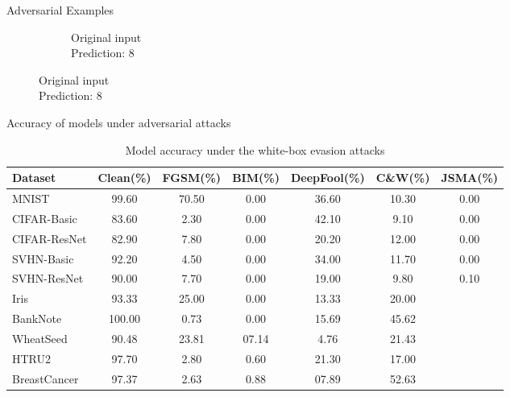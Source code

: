 \documentclass[9pt]{beamer}
\begin{document}
\begin{frame}{Adversarial Examples}
\begin{figure}
\begin{subfigure}[t]{0.24\linewidth}
        \caption{Original input\\Prediction: 8}
    \end{subfigure}
\end{figure}

\hyperlink{preprocessing}{}
\hyperlink{adv_training}{}
\hyperlink{stats}{}
\end{frame}

\begin{frame}{Accuracy of models under adversarial attacks}
\begin{table}
    \centering
    \footnotesize
    \begin{tabular}{|l|c|c|c|c|c|c|}
        \hline
        {Dataset} & {Clean(\%)} & {FGSM(\%)} & {BIM(\%)} & {DeepFool(\%)} & {C\&W(\%)} & {JSMA(\%)} \\
        \hline
        MNIST & 99.60 & 70.50 & 0.00 & 36.60 & 10.30 & 0.00 \\
        CIFAR-Basic & 83.60 & 2.30 & 0.00 & 42.10 & 9.10 & 0.00 \\
        CIFAR-ResNet & 82.90 & 7.80 & 0.00 & 20.20 & 12.00 & 0.00 \\
        SVHN-Basic & 92.20 & 4.50 & 0.00 & 34.00 & 11.70 & 0.00 \\
        SVHN-ResNet & 90.00 & 7.70 & 0.00 & 19.00 & 9.80 & 0.10 \\
        Iris & 93.33 & 25.00 & 0.00 & 13.33 & 20.00 & \\
        BankNote & 100.00 & 0.73 & 0.00 & 15.69 & 45.62 & \\
        WheatSeed & 90.48 & 23.81 & 07.14 & 4.76 & 21.43 & \\
        HTRU2 & 97.70 & 2.80 & 0.60 & 21.30 & 17.00 & \\
        BreastCancer & 97.37 & 2.63 & 0.88 & 07.89 & 52.63 & \\
        \hline
    \end{tabular}
    \caption{Model accuracy under the white-box evasion attacks}
    \label{table:adv_acc}
\end{table}
\end{frame}
\end{document}
